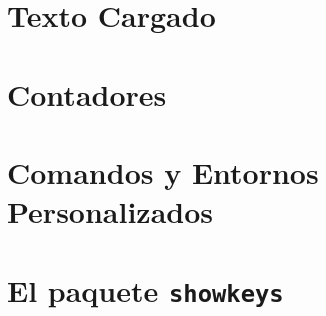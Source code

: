\documentclass[12pt,aspectratio=43]{beamer}
\begin{document}
\section{Texto Cargado}

\section{Contadores}

\section{Comandos y Entornos Personalizados}

\section{El paquete \texttt{showkeys}}
\end{document}
